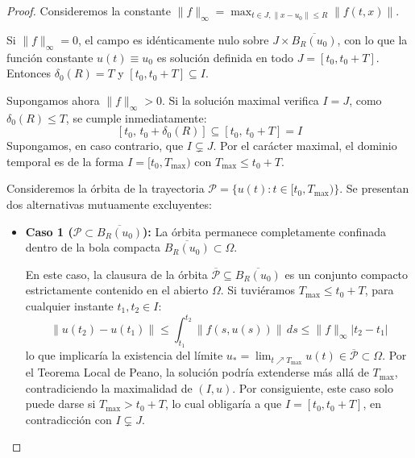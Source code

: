 \begin{proof}
    Consideremos la constante $\|f\|_\infty = \displaystyle\max_{t \in J, \|x - u_0\| \leq R} \|f(t, x)\|$.
    
    Si $\|f\|_\infty = 0$, el campo es idénticamente nulo sobre $J \times \overline{B_R(u_0)}$, con lo que la función constante $u(t) \equiv u_0$ es solución definida en todo $J = [t_0, t_0 + T]$. Entonces $\delta_0(R) = T$ y $[t_0, t_0 + T] \subseteq I$.

    Supongamos ahora $\|f\|_\infty > 0$. Si la solución maximal verifica $I = J$, como $\delta_0(R) \leq T$, se cumple inmediatamente:
    \[
        [t_0, \, t_0 + \delta_0(R)] \subseteq [t_0, \, t_0 + T] = I
    \]
    Supongamos, en caso contrario, que $I \subsetneq J$. Por el carácter maximal, el dominio temporal es de la forma $I = [t_0, T_{\max})$ con $T_{\max} \leq t_0 + T$.
    
    Consideremos la órbita de la trayectoria $\mathcal{P} = \{ u(t) : t \in [t_0, T_{\max}) \}$. Se presentan dos alternativas mutuamente excluyentes:
    \begin{itemize}
        \item \textbf{Caso 1 ($\mathcal{P} \subset \overline{B_R(u_0)}$):} 
        La órbita permanece completamente confinada dentro de la bola compacta $\overline{B_R(u_0)} \subset \Omega$.
        
        En este caso, la clausura de la órbita $\overline{\mathcal{P}} \subseteq \overline{B_R(u_0)}$ es un conjunto compacto estrictamente contenido en el abierto $\Omega$. Si tuviéramos $T_{\max} \leq t_0 + T$, para cualquier instante $t_1, t_2 \in I$:
        \[
            \|u(t_2) - u(t_1)\| \leq \int_{t_1}^{t_2} \|f(s, u(s))\| \, ds \leq \|f\|_\infty |t_2 - t_1|
        \]
        lo que implicaría la existencia del límite $u_* = \lim_{t \nearrow T_{\max}} u(t) \in \overline{\mathcal{P}} \subset \Omega$. Por el Teorema Local de Peano, la solución podría extenderse más allá de $T_{\max}$, contradiciendo la maximalidad de $(I, u)$. Por consiguiente, este caso solo puede darse si $T_{\max} > t_0 + T$, lo cual obligaría a que $I = [t_0, t_0 + T]$, en contradicción con $I \subsetneq J$.


\end{itemize}
\end{proof}
